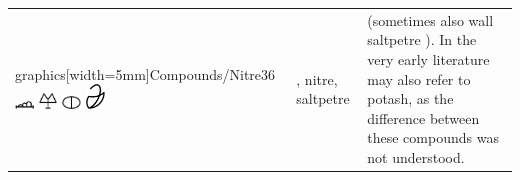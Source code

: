 \documentclass[british,final,landscape]{scrartcl}
\begin{document}
\begin{refsection}
\begin{supertabular}{p{0.3\textwidth}p{0.34\textwidth}p{0.34\textwidth}}
graphics[width=5mm]{Compounds/Nitre36} \includegraphics[width=5mm]{Compounds/Nitre37} \includegraphics[width=5mm]{Compounds/Nitre38} \includegraphics[width=5mm]{Compounds/Nitre39} \includegraphics[width=5mm]{Compounds/Nitre40} & , nitre, saltpetre &  (sometimes also wall saltpetre ). In the very early literature may also refer to potash, as the difference between these compounds was not understood.  \\

\end{supertabular}
\end{refsection}
\end{document}
